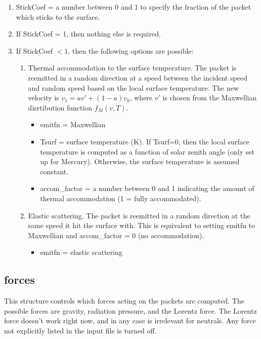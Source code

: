 \documentclass[11pt]{article}
\begin{document}
\begin{enumerate}
\item StickCoef = a number between 0 and 1 to specify the fraction of the 
packet which sticks to the surface. 
\item If StickCoef = 1, then nothing else is required.
\item If StickCoef $<1$, then the following options are possible:
  \begin{enumerate}
  \item Thermal accommodation to the surface temperature. The packet is reemitted in a
  random direction at a speed between the incident speed and random speed based on the
  local surface temperature. The new velocity is $v_1 = a v' + (1-a)v_0$, where $v'$ is
  chosen from the Maxwellian disrtibution function $f_M(v,T)$.
    \begin{itemize}
    \item emitfn = Maxwellian
    \item Tsurf = surface temperature (K). If Tsurf=0, then the local surface
    temperature is computed as a function of solar zenith angle (only set up for
    Mercury). Otherwise, the surface temperature is assumed constant.
    \item accom\_factor = a number between 0 and 1 indicating the amount of thermal
    accommodation (1 = fully accommodated).
    \end{itemize}
  \item Elastic scattering. The packet is reemitted in a random direction at 
  the same speed it hit the surface with. This is equivalent to setting emitfn to
  Maxwellian and accom\_factor = 0 (no accommodation).
    \begin{itemize}
    \item emitfn = elastic scattering
    \end{itemize}
  \end{enumerate}
\end{enumerate}

\subsection{forces}

This structure controls which forces acting on the packets are computed. The 
possible forces are gravity, radiation pressure, and the Lorentz force. The 
Lorentz force doesn't work right now, and in any case is irrelevant for 
neutrals. Any force not explicitly listed in the input file is turned off.
\end{document}
